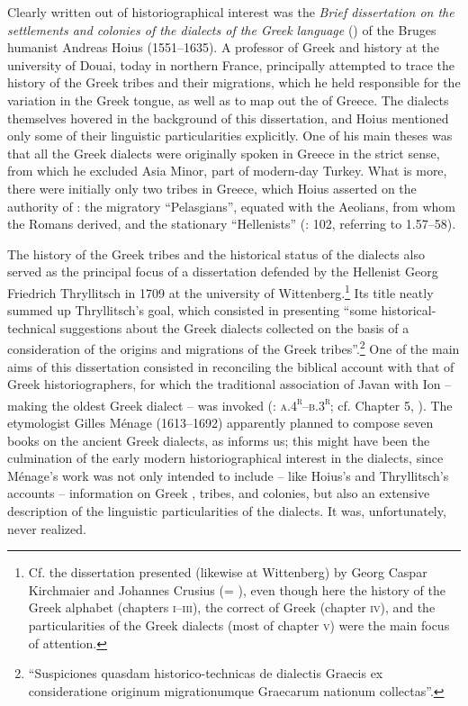 Clearly written out of historiographical interest was the \textit{Brief dissertation on the settlements and colonies of the dialects of the Greek language} (\citeyear{Hoius1620}) of the Bruges humanist Andreas Hoius (1551–1635). A professor of Greek and history at the university of Douai, today in northern France, \citet[95]{Hoius1620} principally attempted to trace the history of the Greek tribes and their migrations, which he held responsible for the variation in the Greek tongue, as well as to map out the  of Greece. The dialects themselves hovered in the background of this dissertation, and Hoius mentioned only some of their linguistic particularities explicitly. One of his main theses was that all the Greek dialects were originally spoken in Greece in the strict sense, from which he excluded Asia Minor, part of modern-day Turkey.\textsuperscript{} What is more, there were initially only two tribes in Greece, which Hoius asserted on the authority of : the migratory “Pelasgians”, equated with the Aeolians, from whom the Romans derived, and the stationary “Hellenists” (\citealt{Hoius1620}: 102, referring to  1.57–58).

The history of the Greek tribes and the historical status of the dialects also served as the principal focus of a dissertation defended by the Hellenist Georg Friedrich Thryllitsch in 1709 at the university of Wittenberg.\footnote{Cf. the dissertation presented (likewise at Wittenberg) by Georg Caspar Kirchmaier and Johannes Crusius (= \citealt{KirchmaierCrusius1684}), even though here the history of the Greek alphabet (chapters \textsc{i}{}--\textsc{iii}), the correct  of Greek (chapter \textsc{iv}), and the particularities of the Greek dialects (most of chapter \textsc{v}) were the main focus of attention.} Its title neatly summed up Thryllitsch’s goal, which consisted in presenting “some historical-technical suggestions about the Greek dialects collected on the basis of a consideration of the origins and migrations of the Greek tribes”.\footnote{“Suspiciones quasdam historico-technicas de dialectis Graecis ex consideratione originum migrationumque Graecarum nationum collectas”.} One of the main aims of this dissertation consisted in reconciling the biblical account with that of Greek historiographers, for which the traditional association of Javan with Ion – making  the oldest Greek dialect – was invoked (\citealt{Thryllitsch1709}: \textsc{a.4}\textsc{\textsuperscript{r}}\textsc{–b.3}\textsc{\textsuperscript{r}}; cf. Chapter 5, ). The  etymologist Gilles Ménage (1613–1692) apparently planned to compose seven books on the ancient Greek dialects, as \citet[252]{Leibniz1991} informs us; this might have been the culmination of the early modern historiographical interest in the dialects, since Ménage’s work was not only intended to include – like Hoius’s and Thryllitsch’s accounts – information on Greek , tribes, and colonies, but also an extensive description of the linguistic particularities of the dialects. It was, unfortunately, never realized.

